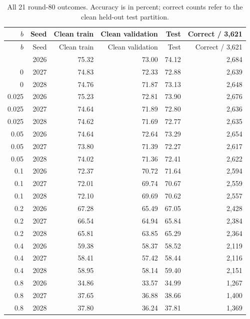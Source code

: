 \begin{longtable}{rrrrrr}
\caption{All 21 round-80 outcomes. Accuracy is in percent; correct counts refer to the clean held-out test partition.}\label{tab:allnoise}\\
\toprule
$b$ & Seed & Clean train & Clean validation & Test & Correct / 3,621\\
\midrule
\endfirsthead
\toprule
$b$ & Seed & Clean train & Clean validation & Test & Correct / 3,621\\
\midrule
\endhead
\bottomrule\endfoot
0 & 2026 & 75.32 & 73.00 & 74.12 & 2,684\\
0 & 2027 & 74.83 & 72.33 & 72.88 & 2,639\\
0 & 2028 & 74.76 & 71.87 & 73.13 & 2,648\\
0.025 & 2026 & 75.23 & 72.81 & 73.90 & 2,676\\
0.025 & 2027 & 74.64 & 71.89 & 72.80 & 2,636\\
0.025 & 2028 & 74.62 & 71.69 & 72.77 & 2,635\\
0.05 & 2026 & 74.64 & 72.64 & 73.29 & 2,654\\
0.05 & 2027 & 73.80 & 71.39 & 72.27 & 2,617\\
0.05 & 2028 & 74.02 & 71.36 & 72.41 & 2,622\\
0.1 & 2026 & 72.37 & 70.72 & 71.64 & 2,594\\
0.1 & 2027 & 72.01 & 69.74 & 70.67 & 2,559\\
0.1 & 2028 & 72.10 & 69.69 & 70.62 & 2,557\\
0.2 & 2026 & 67.28 & 65.49 & 67.05 & 2,428\\
0.2 & 2027 & 66.54 & 64.94 & 65.84 & 2,384\\
0.2 & 2028 & 65.81 & 63.85 & 65.29 & 2,364\\
0.4 & 2026 & 59.38 & 58.37 & 58.52 & 2,119\\
0.4 & 2027 & 58.41 & 57.42 & 58.44 & 2,116\\
0.4 & 2028 & 58.95 & 58.14 & 59.40 & 2,151\\
0.8 & 2026 & 34.86 & 33.57 & 34.99 & 1,267\\
0.8 & 2027 & 37.65 & 36.88 & 38.66 & 1,400\\
0.8 & 2028 & 37.80 & 36.24 & 37.81 & 1,369\\
\end{longtable}
